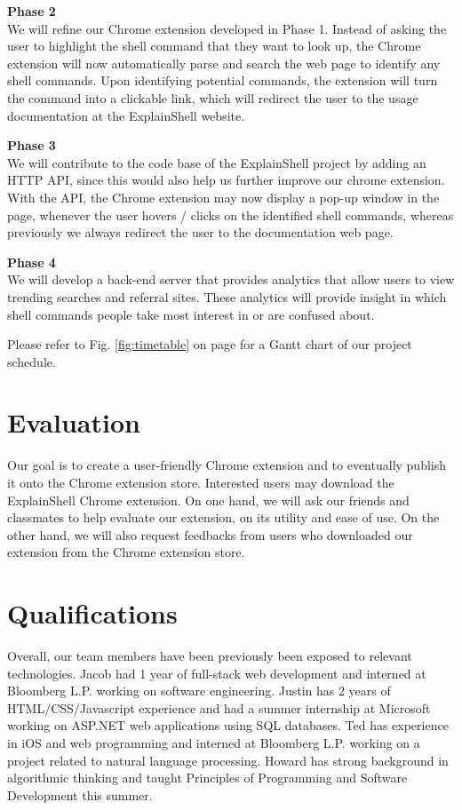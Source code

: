 \documentclass[11pt]{article}
\begin{document}
\par{\bf Phase 2}\\
We will refine our Chrome extension developed in Phase 1. Instead of asking the user to highlight the shell command that they want to look up, the Chrome extension will now automatically parse and search the web page to identify any shell commands. Upon identifying potential commands, the extension will turn the command into a clickable link, which will redirect the user to the usage documentation at the ExplainShell website.

\par{\bf Phase 3}\\
We will contribute to the code base of the ExplainShell project by adding an HTTP API, since this would also help us further improve our chrome extension. With the API, the Chrome extension may now display a pop-up window in the page, whenever the user hovers / clicks on the identified shell commands, whereas previously we always redirect the user to the documentation web page.

\par{\bf Phase 4}\\
We will develop a back-end server that provides analytics that allow users to view trending searches and referral sites. These analytics will provide insight in which shell commands people take most interest in or are confused about.

Please refer to Fig. \ref{fig:timetable} on page \pageref{fig:timetable} for a Gantt chart of our project schedule.

\section{Evaluation}

Our goal is to create a user-friendly Chrome extension and to eventually publish it onto the Chrome extension store. Interested users may download the ExplainShell Chrome extension. On one hand, we will ask our friends and classmates to help evaluate our extension, on its utility and ease of use. On the other hand, we will also request feedbacks from users who downloaded our extension from the Chrome extension store.

\section{Qualifications}

Overall, our team members have been previously been exposed to relevant technologies. Jacob had 1 year of full-stack web development and interned at Bloomberg L.P. working on software engineering. Justin has 2 years of HTML/CSS/Javascript experience and had a summer internship at Microsoft working on ASP.NET web applications using SQL databases. Ted has experience in iOS and web programming and interned at Bloomberg L.P. working on a project related to natural language processing. Howard has strong background in algorithmic thinking and taught Principles of Programming and Software Development this summer. 
\end{document}
